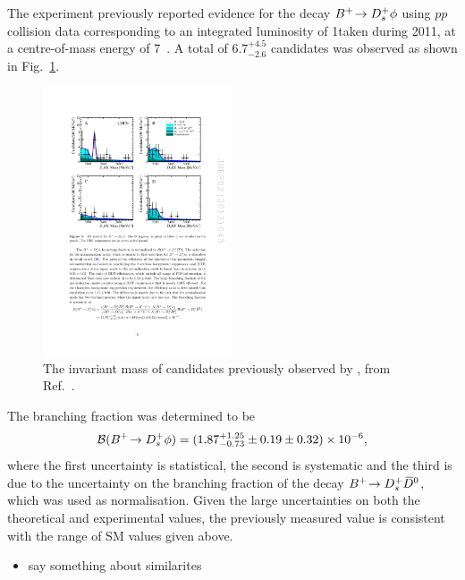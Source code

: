 The \lhcb experiment previously reported evidence for the decay ${{{B}^+}}\!\rightarrow {\ensuremath{{D}^+_{s}}}\phi$ using $pp$ collision data corresponding to an integrated luminosity of 1\invfb taken during 2011, at a centre-of-mass energy of 7\tev~\cite{Aaij:2012zh}. A total of $6.7^{+4.5}_{-2.6}$ candidates was observed as shown in Fig.~\ref{fig:Theory_prev_B2DsPhi}. 
\begin{figure}[!h]
    \centering
    \includegraphics[width=0.5\textwidth]{figs/Theory/Prev_B2DsPhi.pdf}
    \caption{The invariant mass of \decay{\Bp}{\Dsp\phiz} candidates previously observed by \lhcb, from Ref.~\cite{Aaij:2012zh}. }
    \label{fig:Theory_prev_B2DsPhi}   
\end{figure}
The branching fraction was determined to be 
\begin{equation}
\mathcal{B}({{{B}^+}}\!\rightarrow {\ensuremath{{D}^+_{s}}}\phi) = (1.87^{+1.25}_{-0.73} \pm 0.19 \pm 0.32) \times 10^{-6},
\end{equation}
where the first uncertainty is statistical, the second is systematic and the third is due to the uncertainty on the branching fraction of the decay ${{{B}^+}}\!\rightarrow {\ensuremath{{D}^+_{s}}}{\ensuremath{{\kern 0.2em\overline{\kern -0.2em D}{}}{}^0}}$, which was used as normalisation. 
Given the large uncertainties on both the theoretical and experimental values, the previously measured value is consistent with the range of SM values given above.



{\color{Red}
\begin{itemize}
\item say something about similarites 
\end{itemize}}


